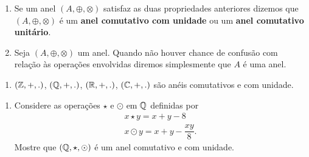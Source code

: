 \documentclass{beamer}
\begin{document}
    \begin{frame}
        \begin{observacoes}
            \begin{enumerate}[label={\arabic*})]
                \conti

                \item Se um anel $(A, \oplus, \otimes)$ \pause satisfaz as duas propriedades anteriores \pause dizemos que $(A, \oplus, \otimes)$ \'e um \textbf{anel comutativo com unidade} \pause ou um \textbf{anel comutativo unit\'ario}.\pause

                \vspace{.5cm}

                \item Seja $(A, \oplus, \otimes)$ um anel. \pause Quando n\~ao houver chance de confus\~ao com rela\c{c}\~ao \`as opera\c{c}\~oes envolvidas diremos simplesmente que \pause $A$ \'e uma anel.\pause
            \end{enumerate}
        \end{observacoes}
    \end{frame}

    \begin{frame}
        \begin{exemplos}
            \begin{enumerate}[label={\arabic*})]
                \item $(\mathbb{Z},+,.)$, \pause $(\mathbb{Q},+,.)$, \pause $(\mathbb{R},+,.)$, \pause $(\mathbb{C},+,.)$ s{\~a}o an{\'e}is comutativos \pause e com unidade.\pause

                \seti
            \end{enumerate}
        \end{exemplos}
    \end{frame}

    \begin{frame}
        \begin{exemplos}
            \begin{enumerate}[label={\arabic*})]
                \conti

                \item Considere as opera\c{c}\~oes $\star$ e $\odot$ em $\mathbb{Q}$ definidas por
                    \begin{align*}
                        x \star y = x + y - 8\\
                        x \odot y = x + y - \dfrac{xy}{8}.
                    \end{align*}
                    Mostre que $(\mathbb{Q}, \star, \odot)$ \'e um anel comutativo e com unidade.
            \end{enumerate}
        \end{exemplos}
    \end{frame}
\end{document}
